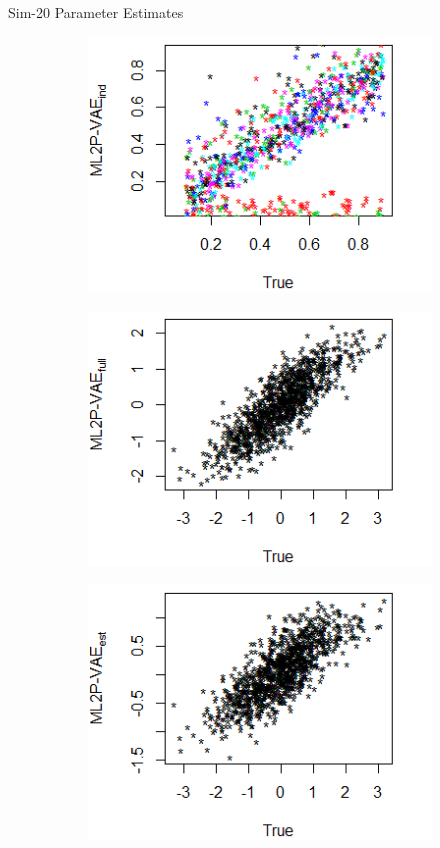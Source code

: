 \documentclass{beamer}
\theoremstyle{definition}
\begin{document}
\begin{frame}{Sim-20 Parameter Estimates}
\begin{figure}[h]
\begin{subfigure}{.32\textwidth}
      \includegraphics[width=.9\linewidth]{../img/ml_journal_results/20skills/vae_ind_disc_20skills.png}
    \end{subfigure}
    \begin{subfigure}{.32\textwidth}
      \centering
      \includegraphics[width=.9\linewidth]{../img/ml_journal_results/20skills/vae_full_theta_20skills.png}
    \end{subfigure}
    \begin{subfigure}{.32\textwidth}
      \centering
      \includegraphics[width=.9\linewidth]{../img/ml_journal_results/20skills/vae_est_theta_20skills.png}

\end{subfigure}
\end{figure}
\end{frame}
\end{document}
